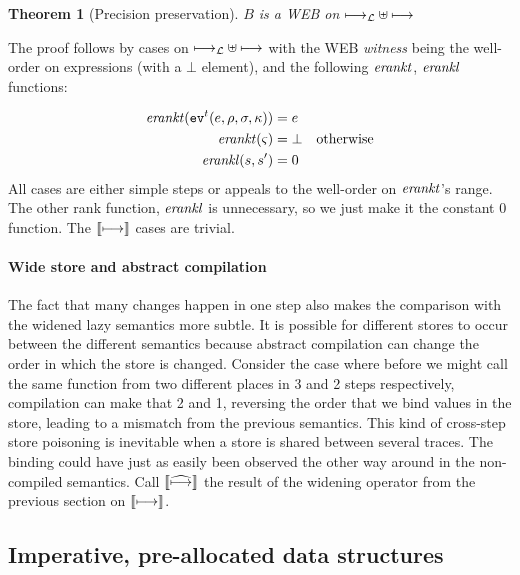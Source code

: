 \documentclass[preprint,onecolumn,9pt]{sigplanconf} %
\newtheorem{theorem}{Theorem}
\begin{document}
\begin{theorem}[Precision preservation]
$B$ is a WEB on $\lmachstep \uplus \machstep$
\end{theorem}

The proof follows by cases on $\lmachstep \uplus \machstep$ with the
WEB \emph{witness} being the well-order on expressions (with a $\bot$
element), and the following $\erankt$, $\erankl$ functions:

\begin{align*}
\erankt(\ev[^\mcntr]{\mexp,\menv,\msto,\mkont}) &= \mexp \\
\erankt(\mstate) &= \bot \quad \text{otherwise} \\
\erankl(s,s') &= 0
\end{align*}
All cases are either simple steps or appeals to the well-order on $\erankt$'s range. The other rank function,
$\erankl$ is unnecessary, so we just make it the constant 0
function. The $\cmachstep$ cases are trivial.

\paragraph{Wide store and abstract compilation}
The fact that many changes happen in one step also makes the
comparison with the widened lazy semantics more subtle. It is possible
for different stores to occur between the different semantics because
abstract compilation can change the order in which the store is
changed. Consider the case where before we might call the same
function from two different places in 3 and 2 steps respectively,
compilation can make that 2 and 1, reversing the order that we bind
values in the store, leading to a mismatch from the previous
semantics. This kind of cross-step store poisoning is inevitable when
a store is shared between several traces. The binding could have just
as easily been observed the other way around in the non-compiled
semantics. Call $\camachstep$ the result of the widening operator from
the previous section on $\cmachstep$.





\subsection{Imperative, pre-allocated data structures}
\end{document}
